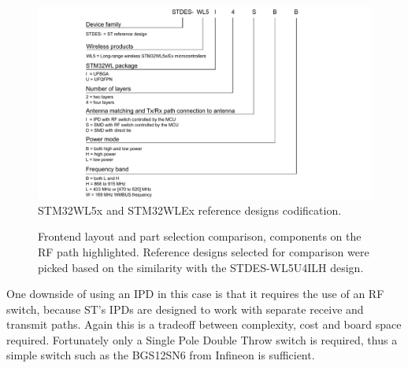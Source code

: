 \begin{figure}
    \includegraphics[width=\textwidth]{fig/STDES-xxxxxxx.png}
    \caption{\label{fig:reference-design-codification}STM32WL5x and STM32WLEx reference designs codification.}
\end{figure}

\begin{figure}
    \centering
    \hfil
    \hfil
    \caption{\label{fig:frontend-comparison}Frontend layout and part selection comparison, components on the RF path highlighted. Reference designs selected for comparison were picked based on the similarity with the STDES-WL5U4ILH design.}
\end{figure}

One downside of using an IPD in this case is that it requires the use of an RF switch, because ST's IPDs are designed to work with separate receive and transmit paths. Again this is a tradeoff between complexity, cost and board space required. Fortunately only a Single Pole Double Throw switch is required, thus a simple switch such as the BGS12SN6 from Infineon \cite{infineon_technologies_bgs12sn6_2024} is sufficient.

